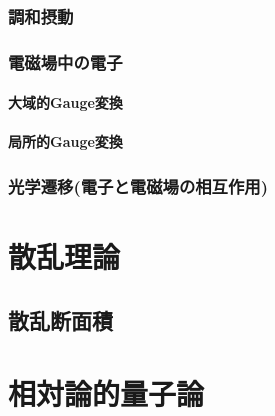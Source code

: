 \documentclass{report}
\begin{document}
      \subsection{調和摂動}
        
      \subsection{電磁場中の電子}
        
        \subsubsection{大域的Gauge変換}
          
        \subsubsection{局所的Gauge変換}
          
      \subsection{光学遷移(電子と電磁場の相互作用)}
        
  \chapter{散乱理論}
    \section{散乱断面積}
  \chapter{相対論的量子論}
\end{document}
